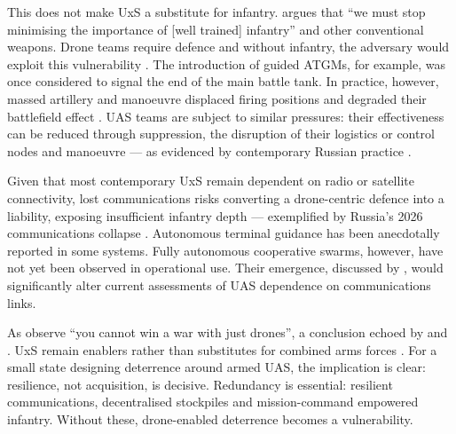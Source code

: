 This does not make UxS a substitute for infantry. \textcite[6:05--12:55]{Leach_curtain} argues that ``we must stop minimising the importance of [well trained] infantry'' and other conventional weapons. Drone teams require defence and without infantry, the adversary would exploit this vulnerability \parencite[7:00--7:30]{Leach_curtain}. The introduction of guided ATGMs, for example, was once considered to signal the end of the main battle tank. In practice, however, massed artillery and manoeuvre displaced firing positions and degraded their battlefield effect \parencite{stu_lyle_participant_11}. UAS teams are subject to similar pressures: their effectiveness can be reduced through suppression, the disruption of their logistics or control nodes and manoeuvre --- as evidenced by contemporary Russian practice \parencite[3]{watling_2025_10}. 

Given that most contemporary UxS remain dependent on radio or satellite connectivity, lost communications risks converting a drone-centric defence into a liability, exposing insufficient infantry depth  \parencite{Axe_sound_of_silence_2026} --- exemplified by Russia’s 2026 communications collapse \parencite{Axe_starlink_2026}. Autonomous terminal guidance has been anecdotally reported in some systems. Fully autonomous cooperative swarms, however, have not yet been observed in operational use. Their emergence, discussed by \textcite{civdiv_12}, would significantly alter current assessments of UAS dependence on communications links. 

As \textcite[19:00--20:50]{Ingvald} observe ``you cannot win a war with just drones'', a conclusion echoed by \textcite[25]{MOLLOY_2024} and \parencite{BRONK_2025}. UxS remain enablers rather than substitutes for combined arms forces \parencite{BRONK_2022a,BRONK_2025,CORNISH_2024,Radec,WATLING_2023A,WATLING_2023B,WATLING_2024A,WATLING_2025B}. For a small state designing deterrence around armed UAS, the implication is clear: resilience, not acquisition, is decisive.  Redundancy is essential: resilient communications, decentralised stockpiles and mission-command empowered infantry. Without these, drone-enabled deterrence becomes a vulnerability.

